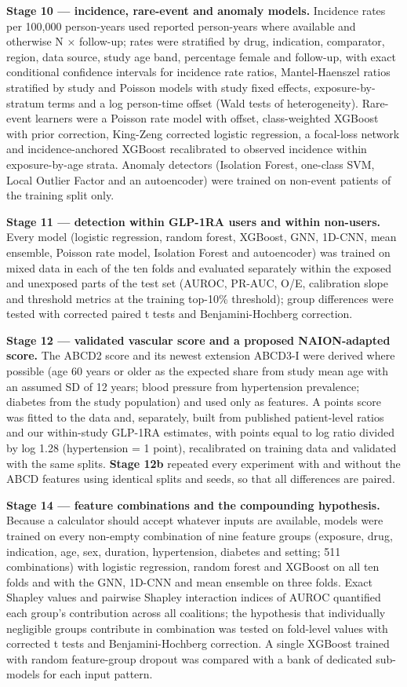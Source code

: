\documentclass[
  11pt,
]{article}
\begin{document}
\textbf{Stage 10 --- incidence, rare-event and anomaly models.}
Incidence rates per 100,000 person-years used reported person-years
where available and otherwise N × follow-up; rates were stratified by
drug, indication, comparator, region, data source, study age band,
percentage female and follow-up, with exact conditional confidence
intervals for incidence rate ratios, Mantel-Haenszel ratios stratified
by study and Poisson models with study fixed effects,
exposure-by-stratum terms and a log person-time offset (Wald tests of
heterogeneity). Rare-event learners were a Poisson rate model with
offset, class-weighted XGBoost with prior correction, King-Zeng
corrected logistic regression, a focal-loss network and
incidence-anchored XGBoost recalibrated to observed incidence within
exposure-by-age strata. Anomaly detectors (Isolation Forest, one-class
SVM, Local Outlier Factor and an autoencoder) were trained on non-event
patients of the training split only.

\textbf{Stage 11 --- detection within GLP-1RA users and within
non-users.} Every model (logistic regression, random forest, XGBoost,
GNN, 1D-CNN, mean ensemble, Poisson rate model, Isolation Forest and
autoencoder) was trained on mixed data in each of the ten folds and
evaluated separately within the exposed and unexposed parts of the test
set (AUROC, PR-AUC, O/E, calibration slope and threshold metrics at the
training top-10\% threshold); group differences were tested with
corrected paired t tests and Benjamini-Hochberg correction.

\textbf{Stage 12 --- validated vascular score and a proposed
NAION-adapted score.} The ABCD2 score and its newest extension ABCD3-I
were derived where possible (age 60 years or older as the expected share
from study mean age with an assumed SD of 12 years; blood pressure from
hypertension prevalence; diabetes from the study population) and used
only as features. A points score was fitted to the data and, separately,
built from published patient-level ratios and our within-study GLP-1RA
estimates, with points equal to log ratio divided by log 1.28
(hypertension = 1 point), recalibrated on training data and validated
with the same splits. \textbf{Stage 12b} repeated every experiment with
and without the ABCD features using identical splits and seeds, so that
all differences are paired.

\textbf{Stage 14 --- feature combinations and the compounding
hypothesis.} Because a calculator should accept whatever inputs are
available, models were trained on every non-empty combination of nine
feature groups (exposure, drug, indication, age, sex, duration,
hypertension, diabetes and setting; 511 combinations) with logistic
regression, random forest and XGBoost on all ten folds and with the GNN,
1D-CNN and mean ensemble on three folds. Exact Shapley values and
pairwise Shapley interaction indices of AUROC quantified each group's
contribution across all coalitions; the hypothesis that individually
negligible groups contribute in combination was tested on fold-level
values with corrected t tests and Benjamini-Hochberg correction. A
single XGBoost trained with random feature-group dropout was compared
with a bank of dedicated sub-models for each input pattern.
\end{document}
